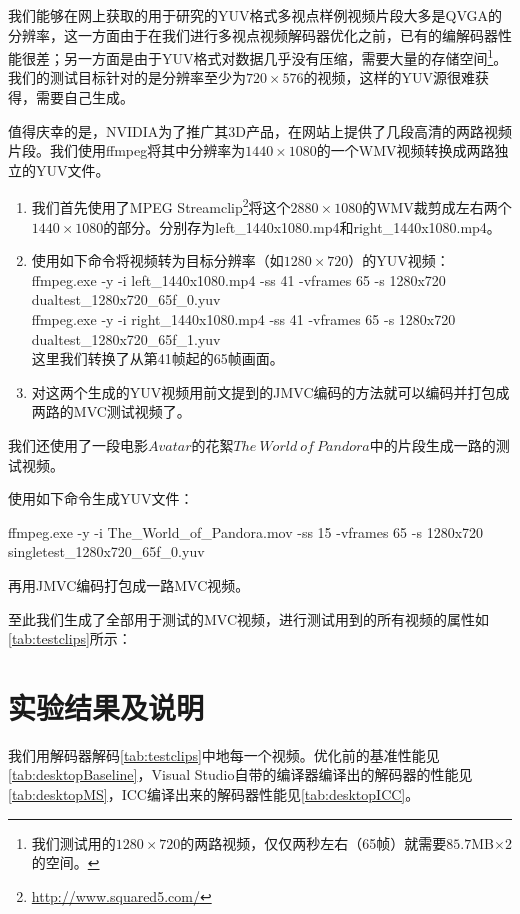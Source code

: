我们能够在网上获取的用于研究的YUV格式多视点样例视频片段大多是QVGA的分辨率，这一方面由于在我们进行多视点视频解码器优化之前，已有的编解码器性能很差；另一方面是由于YUV格式对数据几乎没有压缩，需要大量的存储空间\footnote{我们测试用的$1280\times 720$的两路视频，仅仅两秒左右（65帧）就需要$85.7$MB$\times2$的空间。}。我们的测试目标针对的是分辨率至少为$720\times 576$的视频，这样的YUV源很难获得，需要自己生成。

值得庆幸的是，NVIDIA为了推广其3D产品，在网站上提供了几段高清的两路视频片段。我们使用ffmpeg将其中分辨率为$1440\times 1080$的一个WMV视频转换成两路独立的YUV文件。
\begin{enumerate}
\item 我们首先使用了MPEG Streamclip\footnote{\url{http://www.squared5.com/}}将这个$2880\times 1080$的WMV裁剪成左右两个$1440\times 1080$的部分。分别存为left\_1440x1080.mp4和right\_1440x1080.mp4。
\item 使用如下命令将视频转为目标分辨率（如$1280\times 720$）的YUV视频：\\
ffmpeg.exe -y -i left\_1440x1080.mp4 -ss 41 -vframes 65 -s 1280x720 dualtest\_1280x720\_65f\_0.yuv\\
ffmpeg.exe -y -i right\_1440x1080.mp4 -ss 41 -vframes 65 -s 1280x720 dualtest\_1280x720\_65f\_1.yuv\\
这里我们转换了从第41帧起的65帧画面。
\item 对这两个生成的YUV视频用前文提到的JMVC编码的方法就可以编码并打包成两路的MVC测试视频了。
\end{enumerate}

我们还使用了一段电影$\mathit{Avatar}$的花絮$\mathit{The\ World\ of\ Pandora}$中的片段生成一路的测试视频。

使用如下命令生成YUV文件：

ffmpeg.exe -y -i The\_World\_of\_Pandora.mov -ss 15 -vframes 65 -s 1280x720 singletest\_1280x720\_65f\_0.yuv

再用JMVC编码打包成一路MVC视频。

至此我们生成了全部用于测试的MVC视频，进行测试用到的所有视频的属性如\autoref{tab:testclips}所示：



\section{实验结果及说明}
\label{sec:optresult}

我们用解码器解码\autoref{tab:testclips}中地每一个视频。优化前的基准性能见\autoref{tab:desktopBaseline}，Visual Studio自带的编译器编译出的解码器的性能见\autoref{tab:desktopMS}，ICC编译出来的解码器性能见\autoref{tab:desktopICC}。

